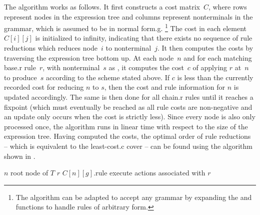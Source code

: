 The algorithm works as follows.
%
It first constructs a cost matrix~$C$, where rows represent \glspl{node} in the
\gls{expression tree} and columns represent \glspl{nonterminal} in the
\gls{grammar}, which is assumed to be in \gls{normal form.g}.%
%
\!\footnote{The algorithm can be adapted to accept any \gls{grammar} by
  expanding the  and 
  functions to handle \glspl{rule} of arbitrary form.}
%
The cost in each element~\mbox{$C[i][j]$} is initialized to infinity, indicating
that there exists no sequence of \glspl{rule reduction} which reduces
\gls{node}~$i$ to \gls{nonterminal}~$j$.
%
It then computes the costs by traversing the \gls{expression tree} bottom up.
%
At each \gls{node}~$n$ and for each matching \gls{base.r} \gls{rule}~$r$, with
\gls{nonterminal}~$s$ as , it computes the cost~$c$ of
applying $r$ at~$n$ to produce~$s$ according to the scheme stated above.
%
If $c$ is less than the currently recorded cost for reducing $n$ to $s$, then
the cost and \gls{rule} information for $n$ is updated accordingly.
%
The same is then done for all \gls{chain.r} \glspl{rule} until it reaches a
fixpoint (which must eventually be reached as all \gls{rule} costs are
non-negative and an update only occurs when the cost is strictly less).
%
Since every \gls{node} is also only processed once, the algorithm runs in linear
time with respect to the size of the \gls{expression tree}.
%
Having computed the costs, the optimal order of \glspl{rule reduction} -- which
is equivalent to the \gls{least-cost.c} \gls{cover} -- can be found using the
algorithm shown in .

\begin{algorithm}[t]
  {%
    $n$ \Assign root node of $T$\;
    $r$ \Assign $C[n][g]$.rule\;
    execute actions associated with $r$\;
  }

  \caption[%
            Algorithm for selecting the rules chosen by
          ]%
          {%
            Selects optimal sequence of rules that reduces a given expression
            tree to a given nonterminal, based on costs computed
            by %
          }
\end{algorithm}

